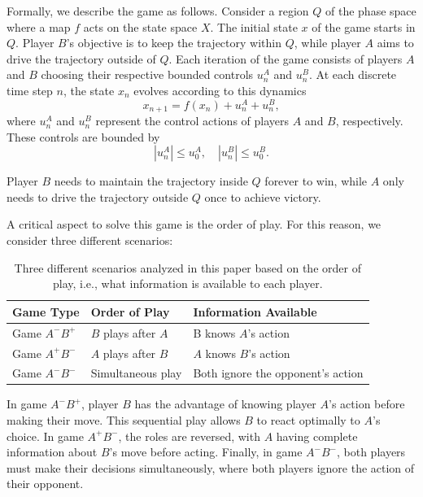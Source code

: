 Formally, we describe the game as follows. Consider a region $Q$ of the phase space where a map $f$ acts on the state space $X$. The initial state $x$ of the game starts in $Q$. Player $B$'s objective is to keep the trajectory within $Q$, while player $A$ aims to drive the trajectory outside of $Q$. Each iteration of the game consists of players $A$ and $B$ choosing their respective bounded controls $u_n^A$ and $u_n^B$.  At each discrete time step $n$, the state $x_n$ evolves according to this dynamics
\begin{equation}
    x_{n+1} = f(x_n) + u_n^A + u_n^B,
\end{equation}
where $u_n^A $ and $u_n^B $ represent the control actions of players $A$ and $B$, respectively. These controls are bounded by
\begin{equation}
    |u_n^A| \leq u_0^A, \quad |u_n^B| \leq u_0^B.
\end{equation}


Player $B$ needs to maintain the trajectory inside $Q$ forever to win, while $A$ only needs to drive the trajectory outside $Q$ once to achieve victory.

A critical aspect to solve this game is the order of play. For this reason, we consider three different scenarios:
\begin{table}[h!]
\centering
\begin{tabular}{|p{3cm}|p{4cm}|p{7.3cm}|}
\hline
\textbf{Game Type} & \textbf{Order of Play} & \textbf{Information Available} \\
\hline
Game $A^{-}B^{+}$ & $B$ plays after $A$ & B knows $A$'s action  \\
\hline
Game $A^{+}B^{-}$ & $A$ plays after $B$ & $A$ knows $B$'s action  \\
\hline
Game $A^{-}B^{-}$ & Simultaneous play & Both ignore the opponent's action  \\
\hline
\end{tabular}
\caption{Three different scenarios analyzed in this paper based on the order of play, i.e., what information is available to each player.}
\label{tab:games}
\end{table}



In game $A^{-}B^{+}$, player $B$ has the advantage of knowing player $A$'s action before making their move. This sequential play allows $B$ to react optimally to $A$'s choice. In game $A^{+}B^{-}$, the roles are reversed, with $A$ having complete information about $B$'s move before acting. Finally, in game $A^{-}B^{-}$, both players must make their decisions simultaneously, where both players ignore the action of their opponent.










